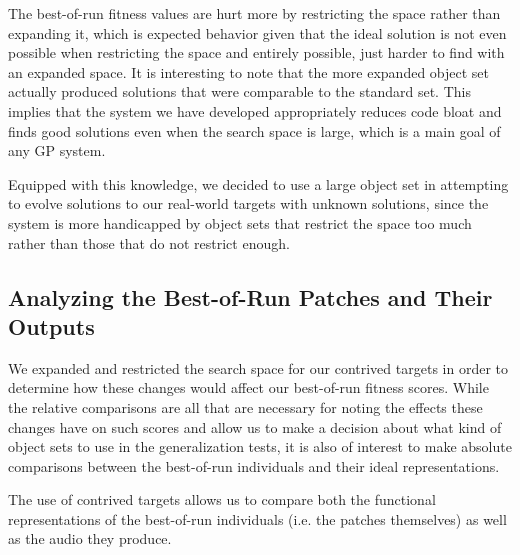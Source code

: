 \documentclass[a4paper,12pt]{report} 	%
\numberwithin{figure}{chapter}
\numberwithin{table}{chapter}
\numberwithin{equation}{chapter}
\begin{document}
\begin{flushleft}
The best-of-run fitness values are hurt more by restricting the space rather than expanding it, which is expected behavior given that the ideal solution is not even possible when restricting the space and entirely possible, just harder to find with an expanded space. It is interesting to note that the more expanded object set actually produced solutions that were comparable to the standard set. This implies that the system we have developed appropriately reduces code bloat and finds good solutions even when the search space is large, which is a main goal of any GP system. 

Equipped with this knowledge, we decided to use a large object set in attempting to evolve solutions to our real-world targets with unknown solutions, since the system is more handicapped by object sets that restrict the space too much rather than those that do not restrict enough.

\subsection{Analyzing the Best-of-Run Patches and Their Outputs}
We expanded and restricted the search space for our contrived targets in order to determine how these changes would affect our best-of-run fitness scores. While the relative comparisons are all that are necessary for noting the effects these changes have on such scores and allow us to make a decision about what kind of object sets to use in the generalization tests, it is also of interest to make absolute comparisons between the best-of-run individuals and their ideal representations. 

The use of contrived targets allows us to compare both the functional representations of the best-of-run individuals (i.e. the patches themselves) as well as the audio they produce.


\end{flushleft}
\end{document}
